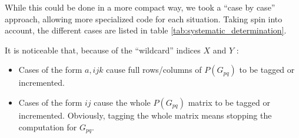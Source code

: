 \documentclass[./thesis.tex]{subfiles}
\begin{document}
While this could be done in a more compact way, we took a ``case by case'' approach, allowing more specialized code for each situation. Taking spin into account, the different cases are listed in table \ref{tab:systematic_determination}.


It is noticeable that, because of the ``wildcard'' indices $X$ and $Y$ :
\begin{itemize}

\item
Cases of the form $a,ijk$ cause full rows/columns of $P(G_{pq})$ to be tagged or incremented.
\item
Cases of the form $ij$ cause the whole $P(G_{pq})$ matrix to be tagged or incremented. Obviously, tagging the whole matrix means stopping the computation for ${G_{pq}}$.
\end{itemize}
\end{document}
